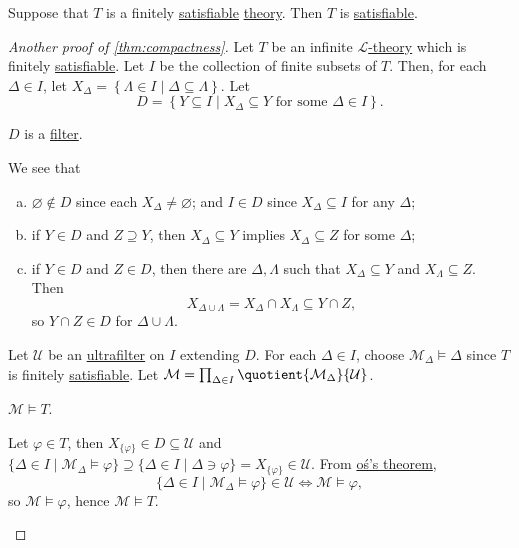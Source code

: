 \begin{prev}
	Suppose that \(T\) is a finitely \hyperref[def:satisfiable]{satisfiable} \hyperref[def:theory]{theory}. Then \(T\) is \hyperref[def:satisfiable]{satisfiable}.
\end{prev}
\begin{proof}[Another proof of \autoref{thm:compactness}]
	Let \(T\) be an infinite \hyperref[def:theory]{\(\mathcal{L} \)-theory} which is finitely \hyperref[def:satisfiable]{satisfiable}. Let \(I\) be the collection of finite subsets of \(T\). Then, for each \(\Delta \in I\), let \(X_\Delta = \left\{ \Lambda \in I \mid \Delta  \subseteq \Lambda  \right\} \). Let
	\[
		D = \left\{ Y \subseteq I \mid X_\Delta \subseteq Y\text{ for some } \Delta \in I \right\}.
	\]

	\begin{claim}
		\(D\) is a \hyperref[def:filter]{filter}.
	\end{claim}
	\begin{explanation}
		We see that
		\begin{enumerate}[(a)]
			\item \(\varnothing \notin D\) since each \(X_\Delta \neq \varnothing \); and \(I \in D\) since \(X_\Delta \subseteq I\) for any \(\Delta \);
			\item if \(Y\in D\) and \(Z\supseteq Y\), then \(X_\Delta \subseteq Y\) implies \(X_\Delta \subseteq Z\) for some \(\Delta \);
			\item if \(Y\in D\) and \(Z\in D\), then there are \(\Delta , \Lambda \) such that \(X_\Delta \subseteq Y\) and \(X_\Lambda \subseteq Z\). Then
			      \[
				      X_{\Delta \cup \Lambda } = X_\Delta \cap X_\Lambda \subseteq Y \cap Z,
			      \]
			      so \(Y \cap Z\in D\) for \(\Delta \cup \Lambda \).
		\end{enumerate}
	\end{explanation}

	Let \(\mathcal{U} \) be an \hyperref[def:ultrafilter]{ultrafilter} on \(I\) extending \(D\). For each \(\Delta \in I\), choose \(\mathcal{M} _\Delta \models \Delta \) since \(T\) is finitely \hyperref[def:satisfiable]{satisfiable}. Let \(\mathcal{M} = \prod_{\Delta \in I} \quotient{\mathcal{M} _\Delta }{\mathcal{U} } \).

	\begin{claim}
		\(\mathcal{M} \models T\).
	\end{claim}
	\begin{explanation}
		Let \(\varphi \in T\), then \(X_{\{ \varphi  \} }\in D \subseteq \mathcal{U} \) and \(\{ \Delta \in I \mid \mathcal{M} _\Delta \models \varphi \} \supseteq \{ \Delta \in I \mid \Delta  \ni \varphi \} = X_{\{ \varphi \} } \in \mathcal{U} \). From \hyperref[thm:Los]{oś's theorem},
		\[
			\{ \Delta \in I \mid \mathcal{M} _\Delta \models \varphi  \} \in \mathcal{U}
			\iff \mathcal{M} \models \varphi ,
		\]
		so \(\mathcal{M} \models \varphi \), hence \(\mathcal{M} \models T\).
	\end{explanation}
\end{proof}

